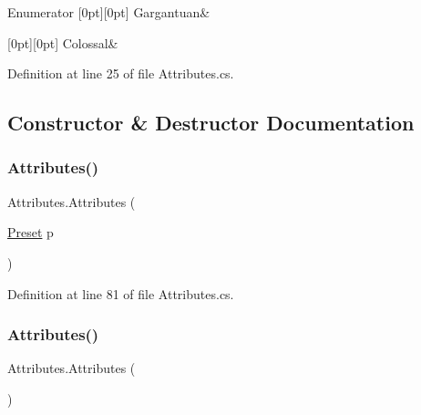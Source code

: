 \begin{DoxyEnumFields}{Enumerator}
[0pt][0pt]{}\mbox{\label{class_attributes_a40f1a5d5f1bcae42392039d603438a2aa15c00858f0c61bab56fc244aaeb165d0}} 
Gargantuan&\\
\hline

[0pt][0pt]{}\mbox{\label{class_attributes_a40f1a5d5f1bcae42392039d603438a2aaa541dd6c4edd4db5876452502073999a}} 
Colossal&\\
\hline

\end{DoxyEnumFields}


Definition at line 25 of file Attributes.\+cs.



\subsection{Constructor \& Destructor Documentation}
\mbox{\label{class_attributes_ae0e1759f4338f340c6fec4e4d0908ff1}} 
\subsubsection{\texorpdfstring{Attributes()}{Attributes()}\hspace{0.1cm}{\footnotesize\ttfamily [1/2]}}
{\footnotesize\ttfamily Attributes.\+Attributes (\begin{DoxyParamCaption}\item[{\mbox{\hyperlink{class_attributes_a2dcc4757e5dd7b7d518f43f4f194d175}{Preset}}}]{p }\end{DoxyParamCaption})}



Definition at line 81 of file Attributes.\+cs.

\mbox{\label{class_attributes_a1821e0b3d7eff63215bba4e8d68d3740}} 
\subsubsection{\texorpdfstring{Attributes()}{Attributes()}\hspace{0.1cm}{\footnotesize\ttfamily [2/2]}}
{\footnotesize\ttfamily Attributes.\+Attributes (\begin{DoxyParamCaption}{ }\end{DoxyParamCaption})}



